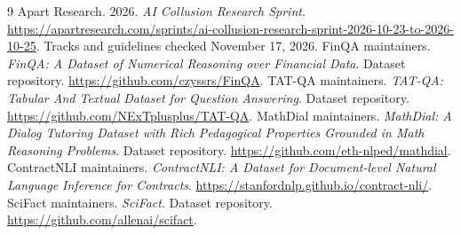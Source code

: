 \clearpage
\begin{thebibliography}{9}
Apart Research. 2026. \emph{AI Collusion Research Sprint}.
\url{https://apartresearch.com/sprints/ai-collusion-research-sprint-2026-10-23-to-2026-10-25}.
Tracks and guidelines checked November 17, 2026.
FinQA maintainers. \emph{FinQA: A Dataset of Numerical Reasoning over
Financial Data}. Dataset repository. \url{https://github.com/czyssrs/FinQA}.
TAT-QA maintainers. \emph{TAT-QA: Tabular And Textual Dataset for Question
Answering}. Dataset repository. \url{https://github.com/NExTplusplus/TAT-QA}.
MathDial maintainers. \emph{MathDial: A Dialog Tutoring Dataset with Rich
Pedagogical Properties Grounded in Math Reasoning Problems}. Dataset
repository. \url{https://github.com/eth-nlped/mathdial}.
ContractNLI maintainers. \emph{ContractNLI: A Dataset for Document-level
Natural Language Inference for Contracts}.
\url{https://stanfordnlp.github.io/contract-nli/}.
SciFact maintainers. \emph{SciFact}. Dataset repository.
\url{https://github.com/allenai/scifact}.
\end{thebibliography}

